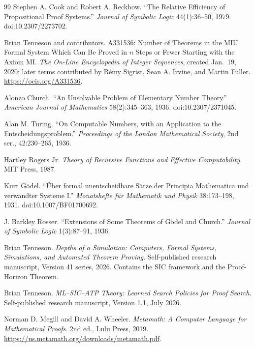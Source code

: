 \documentclass[11pt,oneside]{book}
\theoremstyle{definition}
\theoremstyle{remark}
\begin{document}
\begin{thebibliography}{99}
Stephen A. Cook and Robert A. Reckhow.
\newblock ``The Relative Efficiency of Propositional Proof Systems.''
\newblock \emph{Journal of Symbolic Logic} 44(1):36--50, 1979.
\newblock doi:10.2307/2273702.

Brian Tenneson and contributors.
\newblock A331536: Number of Theorems in the MIU Formal System Which Can Be Proved in $n$ Steps or Fewer Starting with the Axiom MI.
\newblock \emph{The On-Line Encyclopedia of Integer Sequences}, created Jan.~19, 2020; later terms contributed by R\'emy Sigrist, Sean A. Irvine, and Martin Fuller.
\newblock \url{https://oeis.org/A331536}.

Alonzo Church.
\newblock ``An Unsolvable Problem of Elementary Number Theory.''
\newblock \emph{American Journal of Mathematics} 58(2):345--363, 1936.
\newblock doi:10.2307/2371045.

Alan M. Turing.
\newblock ``On Computable Numbers, with an Application to the Entscheidungsproblem.''
\newblock \emph{Proceedings of the London Mathematical Society}, 2nd ser., 42:230--265, 1936.

Hartley Rogers Jr.
\newblock \emph{Theory of Recursive Functions and Effective Computability}.
\newblock MIT Press, 1987.

Kurt G\"odel.
\newblock ``\"Uber formal unentscheidbare S\"atze der Principia Mathematica und verwandter Systeme I.''
\newblock \emph{Monatshefte f\"ur Mathematik und Physik} 38:173--198, 1931.
\newblock doi:10.1007/BF01700692.

J. Barkley Rosser.
\newblock ``Extensions of Some Theorems of G\"odel and Church.''
\newblock \emph{Journal of Symbolic Logic} 1(3):87--91, 1936.

Brian Tenneson.
\newblock \emph{Depths of a Simulation: Computers, Formal Systems, Simulations, and Automated Theorem Proving}.
\newblock Self-published research manuscript, Version 41 series, 2026. Contains the SIC framework and the Proof-Horizon Theorem.

Brian Tenneson.
\newblock \emph{ML--SIC--ATP Theory: Learned Search Policies for Proof Search}.
\newblock Self-published research manuscript, Version 1.1, July 2026.

Norman D. Megill and David A. Wheeler.
\newblock \emph{Metamath: A Computer Language for Mathematical Proofs}.
\newblock 2nd ed., Lulu Press, 2019.
\newblock \url{https://us.metamath.org/downloads/metamath.pdf}.


\end{thebibliography}
\end{document}
